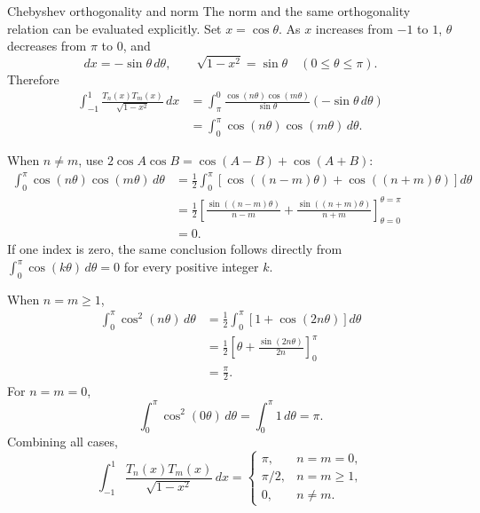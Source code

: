 \documentclass[11pt]{beamer}
\begin{document}
\begin{frame}[allowframebreaks]{Chebyshev orthogonality and norm}
The norm and the same orthogonality relation can be evaluated explicitly.
Set $x=\cos\theta$.  As $x$ increases from $-1$ to $1$, $\theta$ decreases
from $\pi$ to $0$, and
\[
  dx=-\sin\theta\,d\theta,
  \qquad
  \sqrt{1-x^2}=\sin\theta
  \quad (0\le\theta\le\pi).
\]
Therefore
\begin{align*}
  \int_{-1}^{1}
    \frac{T_n(x)T_m(x)}{\sqrt{1-x^2}}\,dx
   &=
    \int_{\pi}^{0}
      \frac{\cos(n\theta)\cos(m\theta)}
           {\sin\theta}
      \left(-\sin\theta\,d\theta\right)\\
   &=
    \int_{0}^{\pi}
      \cos(n\theta)\cos(m\theta)\,d\theta.
\end{align*}

When $n\ne m$, use
$2\cos A\cos B=\cos(A-B)+\cos(A+B)$:
\begin{align*}
  \int_0^\pi\cos(n\theta)\cos(m\theta)\,d\theta
   &=
    \frac12
    \int_0^\pi
      \left[
        \cos((n-m)\theta)+\cos((n+m)\theta)
      \right]d\theta\\
   &=
    \frac12
    \left[
      \frac{\sin((n-m)\theta)}{n-m}
      +\frac{\sin((n+m)\theta)}{n+m}
    \right]_{\theta=0}^{\theta=\pi}\\
   &=0.
\end{align*}
If one index is zero, the same conclusion follows directly from
$\int_0^\pi\cos(k\theta)\,d\theta=0$ for every positive integer $k$.

When $n=m\ge1$,
\begin{align*}
  \int_0^\pi\cos^2(n\theta)\,d\theta
   &=
    \frac12\int_0^\pi
      \left[1+\cos(2n\theta)\right]d\theta\\
   &=
    \frac12
    \left[
      \theta+\frac{\sin(2n\theta)}{2n}
    \right]_{0}^{\pi}\\
   &=\frac{\pi}{2}.
\end{align*}
For $n=m=0$,
\[
  \int_0^\pi\cos^2(0\theta)\,d\theta
   =\int_0^\pi1\,d\theta
   =\pi.
\]
Combining all cases,
\begin{equation}
  \int_{-1}^{1}
    \frac{T_n(x)T_m(x)}{\sqrt{1-x^2}}\,dx
  =
  \begin{cases}
    \pi, & n=m=0,\\[0.2em]
    \pi/2, & n=m\ge1,\\[0.2em]
    0, & n\ne m.
  \end{cases}
  \label{eq:cheby-ortho}
\end{equation}
\end{frame}
\end{document}
